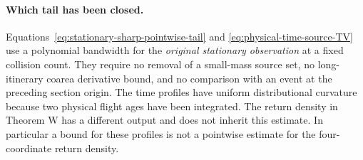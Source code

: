 \paragraph{Which tail has been closed.}
Equations~\eqref{eq:stationary-sharp-pointwise-tail} and
\eqref{eq:physical-time-source-TV} use a polynomial bandwidth for the
\emph{original stationary observation} at a fixed collision count.
They require no removal of a small-mass source set, no long-itinerary
coarea derivative bound, and no comparison with an event at the preceding
section origin. The time profiles have uniform distributional
curvature because two physical flight ages have been integrated.
The return density in Theorem W has a different output and does not
inherit this estimate. In particular a bound for these profiles is not
a pointwise estimate for the four-coordinate return density.
